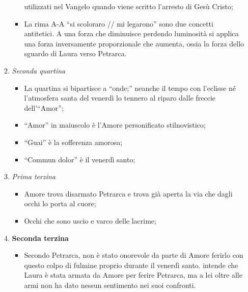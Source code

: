 \documentclass{article}
\begin{document}
\begin{enumerate}
\begin{enumerate}[label=]
\begin{itemize}[label=]
                        utilizzati nel Vangelo quando viene scritto l'arresto di Gesù Cristo;
                    \item La rima A-A ``si scoloraro // mi legarono'' sono due concetti
                        antitetici. A una forza che diminuisce perdendo luminosità si applica
                        una forza inversamente proporzionale che aumenta, ossia la forza dello
                        sguardo di Laura verso Petrarca.
                \end{itemize}
            \item \textit{Seconda quartina}
                \begin{itemize}[label=]
                    \item La quartina si bipartisce a ``onde;''
                        neanche il tempo con l'eclisse né l'atmosfera santa del venerdì lo
                        tennero al riparo dalle freccie dell'``Amor'';
                    \item ``Amor'' in maiuscolo è l'Amore personificato stilnovistico;
                    \item ``Guai'' è la sofferenza amorosa;
                    \item ``Commun dolor'' è il venerdì santo;
                \end{itemize}
            \item \textit{Prima terzina}
                \begin{itemize}[label=]
                    \item Amore trova disarmato Petrarca e trova già aperta la via che dagli
                        occhi lo porta al cuore;
                    \item Occhi che sono uscio e varco delle lacrime;
                \end{itemize}
            \item \textbf{Seconda terzina}
                \begin{itemize}[label=]
                    \item Secondo Petrarca, non è stato onorevole da parte di Amore ferirlo
                        con questo colpo di fulmine proprio durante il venerdì santo.
                     intende che Laura è
                        stata armata da Amore per ferire Petrarca, ma a lei oltre alle armi
                        non ha dato nessun sentimento nei suoi confronti.

\end{itemize}
\end{enumerate}
\end{enumerate}
\end{document}
